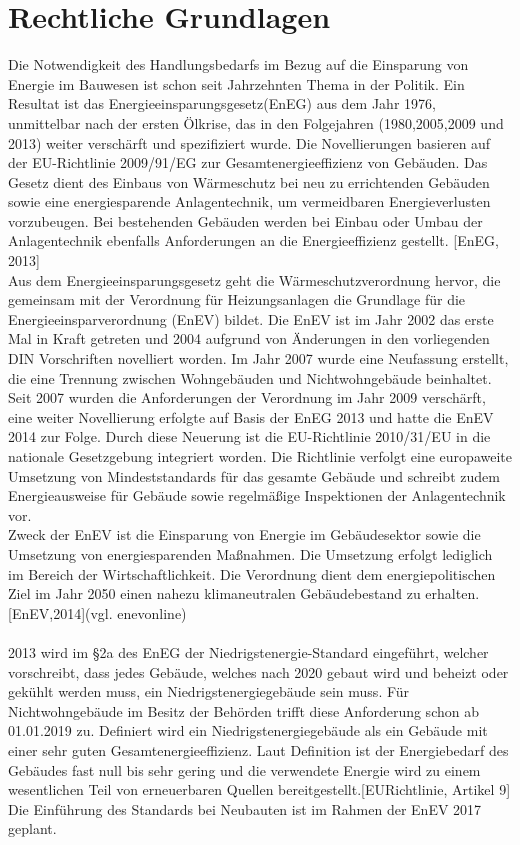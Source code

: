 \chapter{Rechtliche Grundlagen}
\label{cha:Rechtliche Grundlagen}

Die Notwendigkeit des Handlungsbedarfs im Bezug auf die Einsparung von Energie im Bauwesen ist schon seit Jahrzehnten Thema in der Politik. Ein Resultat ist das Energieeinsparungsgesetz(EnEG) aus dem Jahr 1976, unmittelbar nach der ersten Ölkrise, das in den Folgejahren (1980,2005,2009 und 2013) weiter verschärft und spezifiziert wurde. Die Novellierungen basieren auf der EU-Richtlinie 2009/91/EG zur Gesamtenergieeffizienz von Gebäuden. Das Gesetz dient des Einbaus von Wärmeschutz bei neu zu errichtenden Gebäuden sowie eine energiesparende Anlagentechnik, um vermeidbaren Energieverlusten vorzubeugen. Bei bestehenden Gebäuden werden bei Einbau oder Umbau der Anlagentechnik ebenfalls Anforderungen an die Energieeffizienz gestellt. [EnEG, 2013]  \\
Aus dem Energieeinsparungsgesetz geht die Wärmeschutzverordnung hervor, die gemeinsam mit der Verordnung für Heizungsanlagen die  Grundlage für die Energieeinsparverordnung (EnEV) bildet. Die EnEV ist im Jahr 2002 das erste Mal in Kraft getreten und  2004 aufgrund von Änderungen in den vorliegenden DIN Vorschriften novelliert worden. Im Jahr 2007 wurde eine Neufassung erstellt, die eine Trennung zwischen Wohngebäuden und Nichtwohngebäude beinhaltet. Seit 2007 wurden die Anforderungen der Verordnung im Jahr 2009 verschärft, eine weiter Novellierung erfolgte auf Basis der EnEG 2013 und hatte die EnEV 2014 zur Folge. Durch diese Neuerung ist die EU-Richtlinie 2010/31/EU in die nationale Gesetzgebung integriert worden. Die Richtlinie verfolgt eine europaweite Umsetzung von Mindeststandards für das gesamte Gebäude und schreibt zudem Energieausweise für Gebäude sowie regelmäßige Inspektionen der Anlagentechnik vor.\\
Zweck der EnEV ist die Einsparung von Energie im Gebäudesektor sowie die Umsetzung von energiesparenden Maßnahmen. Die Umsetzung erfolgt lediglich im Bereich der Wirtschaftlichkeit. Die Verordnung dient dem energiepolitischen Ziel im Jahr 2050 einen nahezu klimaneutralen Gebäudebestand zu erhalten.[EnEV,2014](vgl. enevonline) \\
\\
2013 wird im §2a des EnEG der Niedrigstenergie-Standard eingeführt, welcher vorschreibt, dass jedes Gebäude, welches nach 2020 gebaut wird und beheizt oder gekühlt werden muss, ein Niedrigstenergiegebäude sein muss. Für Nichtwohngebäude im Besitz der Behörden trifft diese Anforderung schon ab 01.01.2019 zu. Definiert wird ein Niedrigstenergiegebäude als ein Gebäude mit einer sehr guten Gesamtenergieeffizienz. Laut Definition ist der Energiebedarf des Gebäudes fast null bis sehr gering und die verwendete Energie wird zu einem wesentlichen Teil von erneuerbaren Quellen bereitgestellt.[EURichtlinie, Artikel 9] Die Einführung des Standards bei Neubauten ist im Rahmen der EnEV 2017 geplant. \\
